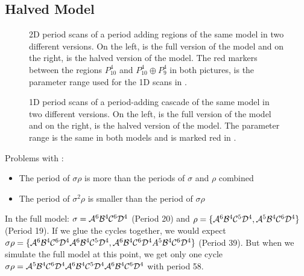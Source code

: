 \subsection{Halved Model}


\begin{figure}
    \centering
    \caption{
        2D period scans of a period adding regions of the same model in two different versions.
        On the left, is the full version of the model and on the right, is the halved version of the model.
        The red markers between the regions $P_{10}^4$ and $P_{10}^4 \oplus P_9^4$ in both pictures, is the parameter range used for the 1D scans in .
    }
    \label{fig:minrep.adding1.corner.period}
\end{figure}

\begin{figure}
    \centering
    \caption{
        1D period scans of a period-adding cascade of the same model in two different versions.
        On the left, is the full version of the model and on the right, is the halved version of the model.
        The parameter range is the same in both models and is marked red in .
    }
    \label{fig:minrep.adding1.motivation.halved.1d.period}
\end{figure}

Problems with :
\begin{itemize}
    \item The period of $\sigma\rho$ is more than the periods of $\sigma$ and $\rho$ combined
    \item The period of $\sigma^2\rho$ is smaller than the period of $\sigma\rho$
\end{itemize}

In the full model: $\sigma = \mathcal{A}^6\mathcal{B}^4\mathcal{C}^6\mathcal{D}^4$ (Period 20) and $\rho = \{\mathcal{A}^6\mathcal{B}^4\mathcal{C}^5\mathcal{D}^4, \mathcal{A}^5\mathcal{B}^4\mathcal{C}^6\mathcal{D}^4\}$ (Period 19).
If we glue the cycles together, we would expect $\sigma\rho = \{\mathcal{A}^6\mathcal{B}^4\mathcal{C}^6\mathcal{D}^4\mathcal{A}^6\mathcal{B}^4\mathcal{C}^5\mathcal{D}^4, \mathcal{A}^6\mathcal{B}^4\mathcal{C}^6\mathcal{D}^4A^5\mathcal{B}^4\mathcal{C}^6\mathcal{D}^4\}$ (Period 39).
But when we simulate the full model at this point, we get only one cycle $\sigma\rho = \mathcal{A}^5\mathcal{B}^4\mathcal{C}^6\mathcal{D}^4\mathcal{A}^6\mathcal{B}^4\mathcal{C}^5\mathcal{D}^4\mathcal{A}^6\mathcal{B}^4\mathcal{C}^6\mathcal{D}^4$ with period 58.

